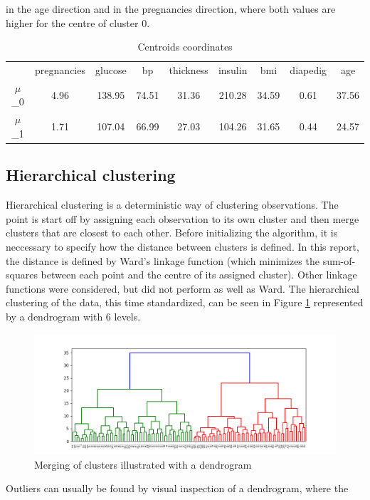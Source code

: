 in the age direction and in the pregnancies direction, where both values are
higher for the centre of cluster 0.\\
\begin{table}[h]
\centering
\begin{tabular}{ccccccccc}
    & pregnancies & glucose & bp & thickness & insulin & bmi & diapedig & age\\
$\mu$_0 & 4.96 & 138.95 & 74.51 & 31.36 & 210.28 & 34.59 & 0.61 & 37.56 \\
$\mu$_1 & 1.71 & 107.04 & 66.99 & 27.03 & 104.26 & 31.65 & 0.44 & 24.57 \\
\end{tabular}
\caption{Centroids coordinates}
\label{cent}
\end{table}

\subsection{Hierarchical clustering}
Hierarchical clustering is a deterministic way of clustering observations. The
point is start off by assigning each observation to its own cluster and then
merge clusters that are closest to each other. Before initializing the algorithm,
it is neccessary to specify how the distance between clusters is defined. In this
report, the distance is defined by Ward's linkage function (which minimizes
the sum-of-squares between each point and the centre of its assigned cluster).
Other linkage functions were considered, but did not perform as well as Ward.
The hierarchical clustering of the data, this time standardized, can be seen
in Figure \ref{dendrogram} represented by a dendrogram with 6 levels.\\
\begin{figure}[htbp]
  \centering
  \includegraphics[width=\textwidth]{Figure_3.png}
  \caption{Merging of clusters illustrated with a dendrogram}
  \label{dendrogram}
\end{figure}
Outliers can usually be found by visual inspection of a dendrogram, where the

